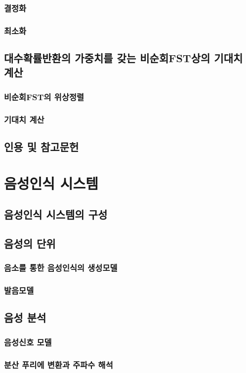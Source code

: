 \documentclass{book}
\begin{document}
\subsection{결정화}
\subsection{최소화}
\section{대수확률반환의 가중치를 갖는 비순회FST상의 기대치 계산}
\subsection{비순회FST의 위상정렬}
\subsection{기대치 계산}
\section*{인용 및 참고문헌}

\chapter{음성인식 시스템}
\section{음성인식 시스템의 구성}
\section{음성의 단위}
\subsection{음소를 통한 음성인식의 생성모델}
\subsection{발음모델}
\label{subsec:pronunciation-model}

\section{음성 분석}
\subsection{음성신호 모델}
\subsection{분산 푸리에 변환과 주파수 해석}
\end{document}

